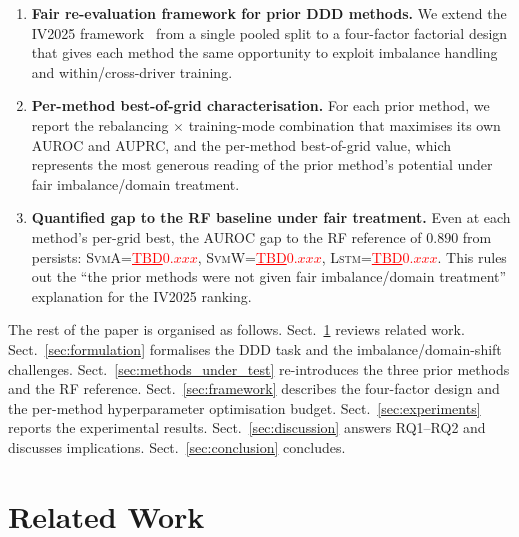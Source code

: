 \documentclass[lettersize,journal]{IEEEtran}
\newcommand{\Impl}[1]{\textsc{#1}}
\newcommand{\TBD}[1]{\textcolor{red}{\underline{TBD#1}}}
\begin{document}
\begin{enumerate}
\item \textbf{Fair re-evaluation framework for prior DDD methods.}
We extend the IV2025 framework~\cite{nakagama2025iv} from a single pooled split to a four-factor factorial design that gives each method the same opportunity to exploit imbalance handling and within/cross-driver training.

\item \textbf{Per-method best-of-grid characterisation.}
For each prior method, we report the rebalancing $\times$ training-mode combination that maximises its own AUROC and AUPRC, and the per-method best-of-grid value, which represents the most generous reading of the prior method's potential under fair imbalance/domain treatment.

\item \textbf{Quantified gap to the RF baseline under fair treatment.}
Even at each method's per-grid best, the AUROC gap to the \Impl{RF} reference of $0.890$ from~\cite{nakagama2025factorial} persists: \Impl{SvmA}=\TBD{$0.\textit{xxx}$}, \Impl{SvmW}=\TBD{$0.\textit{xxx}$}, \Impl{Lstm}=\TBD{$0.\textit{xxx}$}.
This rules out the ``the prior methods were not given fair imbalance/domain treatment'' explanation for the IV2025 ranking.
\end{enumerate}

The rest of the paper is organised as follows.
Sect.~\ref{sec:related} reviews related work.
Sect.~\ref{sec:formulation} formalises the DDD task and the imbalance/domain-shift challenges.
Sect.~\ref{sec:methods_under_test} re-introduces the three prior methods and the \Impl{RF} reference.
Sect.~\ref{sec:framework} describes the four-factor design and the per-method hyperparameter optimisation budget.
Sect.~\ref{sec:experiments} reports the experimental results.
Sect.~\ref{sec:discussion} answers RQ1--RQ2 and discusses implications.
Sect.~\ref{sec:conclusion} concludes.

\section{Related Work}
\label{sec:related}
\end{document}
